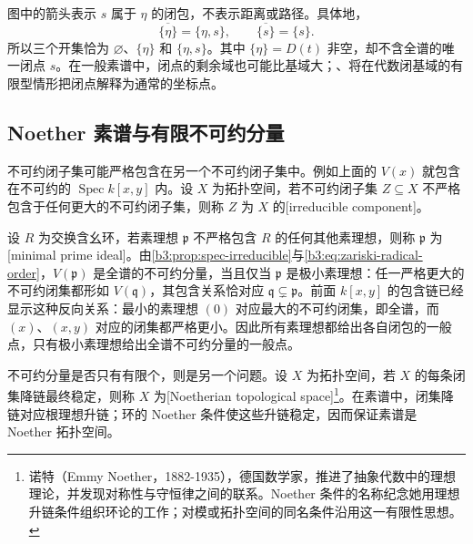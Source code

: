 图中的箭头表示 \(s\) 属于 \(\eta\) 的闭包，不表示距离或路径。具体地，
\[
	\overline{\{\eta\}}=\{\eta,s\},\qquad \overline{\{s\}}=\{s\}.
\]
所以三个开集恰为 \(\varnothing\)、\(\{\eta\}\) 和 \(\{\eta,s\}\)。其中 \(\{\eta\}=D(t)\) 非空，却不含全谱的唯一闭点 \(s\)。在一般素谱中，闭点的剩余域也可能比基域大；、将在代数闭基域的有限型情形把闭点解释为通常的坐标点。

\subsection{Noether 素谱与有限不可约分量}
\label{b3:subsec:0103:04}

不可约闭子集可能严格包含在另一个不可约闭子集中。例如上面的 \(V(x)\) 就包含在不可约的 \(\operatorname{Spec}k[x,y]\) 内。设 \(X\) 为拓扑空间，若不可约闭子集 \(Z\subseteq X\) 不严格包含于任何更大的不可约闭子集，则称 \(Z\) 为 \(X\) 的[irreducible component]。

\ProseParagraphBreak
设 \(R\) 为交换含幺环，若素理想 \(\mathfrak p\) 不严格包含 \(R\) 的任何其他素理想，则称 \(\mathfrak p\) 为[minimal prime ideal]。由\cref{b3:prop:spec-irreducible}与\eqref{b3:eq:zariski-radical-order}，\(V(\mathfrak p)\) 是全谱的不可约分量，当且仅当 \(\mathfrak p\) 是极小素理想：任一严格更大的不可约闭集都形如 \(V(\mathfrak q)\)，其包含关系恰对应 \(\mathfrak q\subsetneq\mathfrak p\)。前面 \(k[x,y]\) 的包含链已经显示这种反向关系：最小的素理想 \((0)\) 对应最大的不可约闭集，即全谱，而 \((x)\)、\((x,y)\) 对应的闭集都严格更小。因此所有素理想都给出各自闭包的一般点，只有极小素理想给出全谱不可约分量的一般点。

\ProseParagraphBreak
不可约分量是否只有有限个，则是另一个问题。设 \(X\) 为拓扑空间，若 \(X\) 的每条闭集降链最终稳定，则称 \(X\) 为[Noetherian topological space]\footnote{诺特（Emmy Noether，1882-1935），德国数学家，推进了抽象代数中的理想理论，并发现对称性与守恒律之间的联系。Noether 条件的名称纪念她用理想升链条件组织环论的工作；对模或拓扑空间的同名条件沿用这一有限性思想。}。在素谱中，闭集降链对应根理想升链；环的 Noether 条件使这些升链稳定，因而保证素谱是 Noether 拓扑空间。

